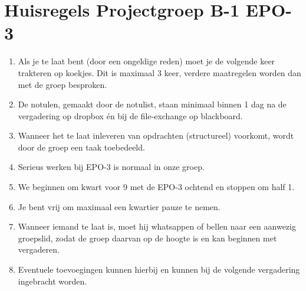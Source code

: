 \documentclass{article}
\begin{document}
\section*{Huisregels Projectgroep B-1 EPO-3}

\begin{enumerate}
\item Als je te laat bent (door een ongeldige reden) moet je de volgende keer trakteren op 
koekjes. Dit is maximaal 3 keer, verdere maatregelen worden dan met de groep 
besproken.

\item De notulen, gemaakt door de notulist, staan minimaal binnen 1 dag na de vergadering op dropbox 
én bij de file-exchange op blackboard.

\item Wanneer het te laat inleveren van opdrachten (structureel) voorkomt, wordt door de 
groep een taak toebedeeld.

\item Serieus werken bij EPO-3 is normaal in onze groep. 

\item We beginnen om kwart voor 9 met de EPO-3 ochtend en stoppen om half 1.

\item Je bent vrij om maximaal een kwartier pauze te nemen. 

\item Wanneer iemand te laat is, moet hij whatsappen of bellen naar een aanwezig groepslid, 
zodat de groep daarvan op de hoogte is en kan beginnen met vergaderen. 

\item Eventuele toevoegingen kunnen hierbij en kunnen bij de volgende vergadering 
ingebracht worden.

\end{enumerate}
\end{document}
